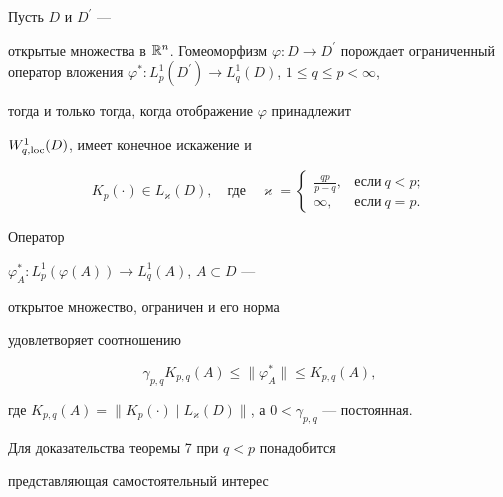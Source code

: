 \begin{thm}


Пусть $D$ и $D^{\prime}$ ---


открытые множества в ${\Bbb R}^n$. Гомеоморфизм $\varphi :D\to


D^{\prime}$ порождает ограниченный оператор вложения $\varphi^{*}


:L_{p}^{1}(D^{\prime})\to L_{q}^{1}(D)$, $1\leq q\leq p<\infty$,


тогда и только тогда, когда отображение $\varphi$ принадлежит


$W^1_{q,\operatorname{loc}}(D)$, имеет конечное искажение и


$$


K_p(\cdot)\in


L_\varkappa(D),\quad\text{где}\quad \varkappa=


\begin{cases}


\frac{qp}{p-q}, &\text{если}\ q<p;\\


\infty, &\text{если}\ q=p.


\end{cases}


$$





Оператор


$\varphi^{*}_A :L_{p}^{1}(\varphi(A))\to L_{q}^{1}(A)$, $A\subset D$ ---


открытое множество, ограничен и его норма


удовлетворяет соотношению


\begin{equation}


\gamma_{p,q} K_{p,q}(A)\leq\|\varphi^{*}_A \| \leq


K_{p,q}(A),


\end{equation}


где $K_{p,q}(A)=\|K_p(\cdot)\mid


L_\varkappa(D)\|$, а $0<\gamma_{p,q}$ --- постоянная.


\end{thm}





Для доказательства теоремы 7 при $q<p$ понадобится


представляющая самостоятельный интерес





